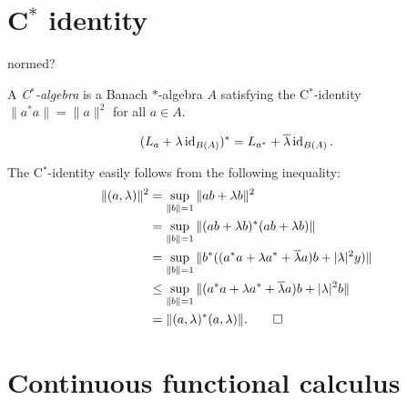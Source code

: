 \documentclass{../../large}
\begin{document}
\section{C$^*$ identity}
\begin{prb}[$*$-algebras]
normed?
\end{prb}


\begin{prb}[C$^*$-identity]
A \emph{C$^*$-algebra} is a Banach $*$-algebra $A$ satisfying the C$^*$-identity $\|a^*a\|=\|a\|^2$ for all $a\in A$.
\end{prb}


\begin{prb}[Unitization]
\[(L_a+\lambda\id_{B(A)})^*=L_{a^*}+\bar\lambda\id_{B(A)}.\]
\end{prb}
\begin{pf}
The C$^*$-identity easily follows from the following inequality:
\begin{align*}
\|(a,\lambda)\|^2&=\sup_{\|b\|=1}\|ab+\lambda b\|^2\\
&=\sup_{\|b\|=1}\|(ab+\lambda b)^*(ab+\lambda b)\|\\
&=\sup_{\|b\|=1}\|b^*((a^*a+\lambda a^*+\bar\lambda a)b+|\lambda|^2y)\|\\
&\le\sup_{\|b\|=1}\|(a^*a+\lambda a^*+\bar\lambda a)b+|\lambda|^2b\|\\
&=\|(a,\lambda)^*(a,\lambda)\|.\qedhere
\end{align*}
\end{pf}





\section{Continuous functional calculus}
\end{document}
